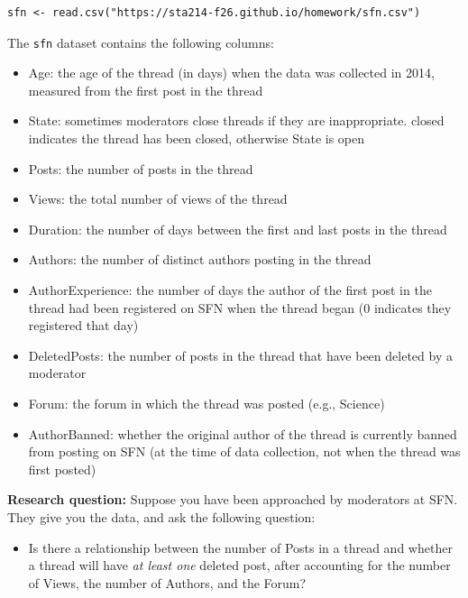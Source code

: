 \documentclass[11pt]{article}
\begin{document}
\begin{verbatim}
sfn <- read.csv("https://sta214-f26.github.io/homework/sfn.csv")
\end{verbatim}

\noindent The \texttt{sfn} dataset contains the following columns:

\begin{itemize}
\item Age: the age of the thread (in days) when the data was collected in 2014, measured from the first post in the thread
\item State: sometimes moderators close threads if they are inappropriate. closed indicates the thread has been closed, otherwise State is open
\item Posts: the number of posts in the thread
\item Views: the total number of views of the thread
\item Duration: the number of days between the first and last posts in the thread
\item Authors: the number of distinct authors posting in the thread
\item AuthorExperience: the number of days the author of the first post in the thread had been registered on SFN when the thread began (0 indicates they registered that day)
\item DeletedPosts: the number of posts in the thread that have been deleted by a moderator
\item Forum: the forum in which the thread was posted (e.g., Science)
\item AuthorBanned: whether the original author of the thread is currently banned from posting on SFN (at the time of data collection, not when the thread was first posted)
\end{itemize}

\noindent \textbf{Research question:} Suppose you have been approached by moderators at SFN. They give you the data, and ask the following question:
\begin{itemize}
\item Is there a relationship between the number of Posts in a thread and whether a thread will have \textit{at least one} deleted post, after accounting for the number of Views, the number of Authors, and the Forum?
\end{itemize}
\end{document}
